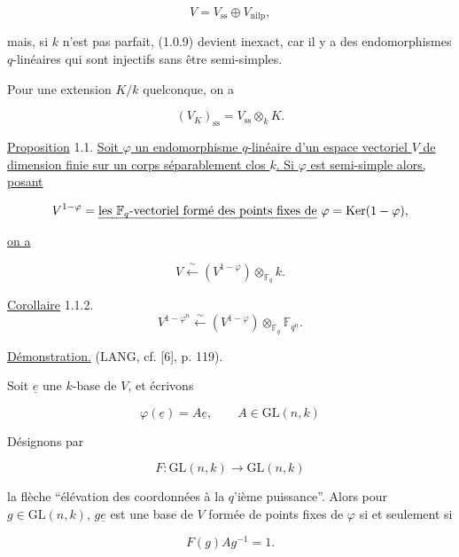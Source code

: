 \begin{equation}\tag{1.0.9}
V=V_{\mathrm{ss}}\oplus V_{\mathrm{nilp}},
\end{equation}

mais, si $k$ n'est pas parfait, (1.0.9) devient inexact, car il y a des
endomorphismes $q$-linéaires qui sont injectifs sans être semi-simples.

Pour une extension $K/k$ quelconque, on a

\begin{equation}\tag{1.0.10}
(V_K)_{\mathrm{ss}}=V_{\mathrm{ss}}\otimes_k K.
\end{equation}

\underline{Proposition} 1.1. \underline{Soit $\varphi$ un endomorphisme
$q$-linéaire d'un espace vectoriel $V$ de dimension finie sur un corps
séparablement clos $k$. Si $\varphi$ est semi-simple alors, posant}

\[
V^{1-\varphi}=\text{\underline{les $\mathbb F_q$-vectoriel formé des points fixes de}
$\varphi$}=\Ker(1-\varphi),
\]

\underline{on a}

\begin{equation}\tag{1.1.1}
V\xleftarrow{\ \sim\ }
(V^{1-\varphi})\otimes_{\mathbb F_q}k.
\end{equation}


\underline{Corollaire} 1.1.2.
\[
V^{1-\varphi^n}\xleftarrow{\ \sim\ }
(V^{1-\varphi})\otimes_{\mathbb F_q}\mathbb F_{q^n}.
\]

\underline{Démonstration.} (LANG, cf. [6], p. 119).

Soit $\underline{e}$ une $k$-base de $V$, et écrivons

\begin{equation}\tag{1.1.3}
\varphi(\underline{e})=A\underline{e},\qquad A\in\mathrm{GL}(n,k)
\end{equation}

Désignons par

\begin{equation}\tag{1.1.4}
F:\mathrm{GL}(n,k)\longrightarrow\mathrm{GL}(n,k)
\end{equation}

la flèche ``élévation des coordonnées à la $q$'ième puissance''. Alors pour
$g\in\mathrm{GL}(n,k)$, $g\underline{e}$ est une base de $V$ formée de points fixes de
$\varphi$ si et seulement si

\begin{equation}\tag{1.1.5}
F(g)Ag^{-1}=1.
\end{equation}

